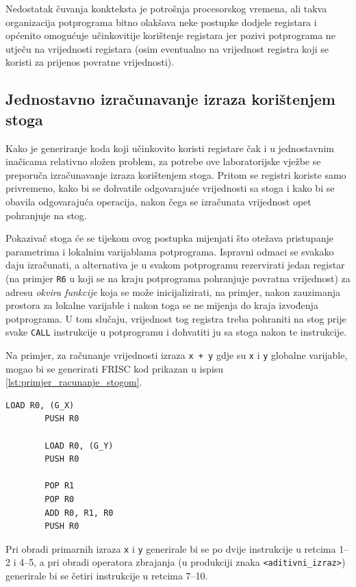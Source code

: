 \documentclass[times, 12pt, utf8]{book}
\begin{document}
Nedostatak čuvanja konkteksta je potrošnja procesorskog vremena, ali takva organizacija potprograma bitno olakšava neke postupke dodjele registara i općenito omogućuje učinkovitije korištenje registara jer pozivi potprograma ne utječu na vrijednosti registara (osim eventualno na vrijednost registra koji se koristi za prijenos povratne vrijednosti).

\subsection{Jednostavno izračunavanje izraza korištenjem stoga}\label{sec:izracunavanje_izraza}
Kako je generiranje koda koji učinkovito koristi registare čak i u jednostavnim inačicama relativno složen problem, za potrebe ove laboratorijske vježbe se preporuča izračunavanje izraza korištenjem stoga.
Pritom se registri koriste samo privremeno, kako bi se dohvatile odgovarajuće vrijednosti sa stoga i kako bi se obavila odgovarajuća operacija, nakon čega se izračunata vrijednost opet pohranjuje na stog.

Pokazivač stoga će se tijekom ovog postupka mijenjati što otežava pristupanje parametrima i lokalnim varijablama potprograma.
Ispravni odmaci se svakako daju izračunati, a alternativa je u svakom potprogramu rezervirati jedan registar (na primjer \verb|R6| u koji se na kraju potprograma pohranjuje povratna vrijednost) za adresu \emph{okvira funkcije} koja se može inicijalizirati, na primjer, nakon zauzimanja prostora za lokalne varijable i nakon toga se ne mijenja do kraja izvođenja potprograma.
U tom slučaju, vrijednost tog registra treba pohraniti na stog prije svake \verb|CALL| instrukcije u potprogramu i dohvatiti ju sa stoga nakon te instrukcije.

Na primjer, za računanje vrijednosti izraza \verb|x + y| gdje su \verb|x| i \verb|y| globalne varijable, mogao bi se generirati FRISC kod prikazan u ispisu \ref{lst:primjer_racunanje_stogom}.

\begin{lstlisting}[caption={Računanje izraza \texttt{x + y} primjenom stoga.},label=lst:primjer_racunanje_stogom]
        LOAD R0, (G_X)
        PUSH R0

        LOAD R0, (G_Y)
        PUSH R0

        POP R1
        POP R0
        ADD R0, R1, R0
        PUSH R0
\end{lstlisting}

Pri obradi primarnih izraza \verb|x| i \verb|y| generirale bi se po dvije instrukcije u retcima 1--2 i 4--5, a pri obradi operatora zbrajanja (u produkciji znaka \verb|<aditivni_izraz>|) generirale bi se četiri instrukcije u retcima 7--10.
\end{document}
